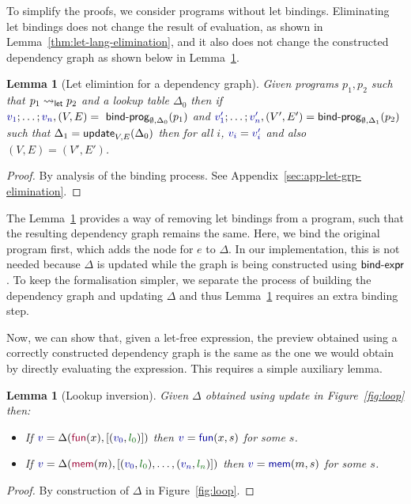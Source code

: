 \documentclass[english,submission]{programming}
\newcounter{thc}
\theoremstyle{plain}
\newtheorem{lem}[thc]{Lemma}
\theoremstyle{definition}
\newcommand{\ident}[1]{\textnormal{\textcolor{idclr}{\sffamily #1}}}
\newcommand{\bndclr}[1]{\textcolor{kvdclr}{#1}}
\newcommand{\blblclr}[1]{\textcolor{numclr}{#1}}
\newcommand{\bnd}[1]{\textnormal{\textcolor{kvdclr}{\sffamily #1}}}
\newcommand{\bknd}[1]{\textnormal{\textcolor{prepclr}{\sffamily #1}}}
\begin{document}
To simplify the proofs, we consider programs without let bindings. Eliminating let bindings does
not change the result of evaluation, as shown in Lemma~\ref{thm:let-lang-elimination}, and it also
does not change the constructed dependency graph as shown below in Lemma~\ref{thm:let-grp-elimination}.

\begin{lem}[Let elimintion for a dependency graph]
\label{thm:let-grp-elimination}
Given programs $p_1, p_2$ such that $p_1 \rightsquigarrow_\ident{let} p_2$ and a lookup table
$\Delta_0$ then if $\bndclr{v_1}; \ldots; \bndclr{v_n}, (V, E) = \ident{bind-prog}_{\emptyset, \Delta_0}(p_1)$ and
$\bndclr{v'_1};\ldots;\bndclr{v'_n}, (V', E') = \ident{bind-prog}_{\emptyset, \Delta_1}(p_2)$ such that $\Delta_1 = \ident{update}_{V, E}(\Delta_0)$
then for all $i$, $\bndclr{v_i} = \bndclr{v'_i}$ and also $(V, E) = (V', E')$.
\end{lem}
\begin{proof}
By analysis of the binding process. See Appendix~\ref{sec:app-let-grp-elimination}.
\end{proof}

\noindent
The Lemma~\ref{thm:let-grp-elimination} provides a way of removing let bindings from a program,
such that the resulting dependency graph remains the same. Here, we bind the original program
first, which adds the node for $e$ to $\Delta$. In our implementation, this is not needed
because $\Delta$ is updated while the graph is being constructed using $\ident{bind-expr}$.
To keep the formalisation simpler, we separate the process of building the dependency graph
and updating $\Delta$ and thus Lemma~\ref{thm:let-grp-elimination} requires an extra binding step.

Now, we can show that, given a let-free expression, the preview obtained using a correctly
constructed dependency graph is the same as the one we would obtain by directly evaluating the
expression. This requires a simple auxiliary lemma.

\begin{lem}[Lookup inversion]
\label{thm:lemma-lookup}
Given $\Delta$ obtained using \ident{update} in Figure~\ref{fig:loop} then:
\begin{itemize}
\raggedright
\item[--] If $\bndclr{v}=\Delta(\bknd{fun}(x),[(\bndclr{v_0}, \blblclr{l_0})])$
then $\bndclr{v}=\bnd{fun}(x, s)$ for some $s$.
\item[--] If $\bndclr{v}=\Delta(\bknd{mem}(m),[(\bndclr{v_0}, \blblclr{l_0}), \ldots, (\bndclr{v_n}, \blblclr{l_n})])$
then $\bndclr{v}=\bnd{mem}(m, s)$ for some $s$.
\end{itemize}
\end{lem}
\begin{proof}
By construction of $\Delta$ in Figure~\ref{fig:loop}.
\end{proof}
\end{document}
